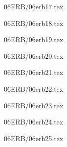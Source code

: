 \documentclass[9pt, xcolor={svgnames, x11names},professionalfonts]{beamer}
\def\scale{1}
\begin{document}

\begin{frame}{06ERB/06erb17.tex}	
	\def\scale{0.625}
	
\end{frame}


\begin{frame}{06ERB/06erb18.tex}	
	\def\scale{0.55}
	
\end{frame}


\begin{frame}{06ERB/06erb19.tex}	
	\def\scale{0.55}
	
\end{frame}


\begin{frame}{06ERB/06erb20.tex}	
	\def\scale{0.875}
	
\end{frame}


\begin{frame}{06ERB/06erb21.tex}	
	\def\scale{0.75}
	
\end{frame}


\begin{frame}{06ERB/06erb22.tex}	
	\def\scale{0.75}
	
\end{frame}


\begin{frame}{06ERB/06erb23.tex}	
	\def\scale{0.75}
	
\end{frame}


\begin{frame}{06ERB/06erb24.tex}	
	\def\scale{0.75}
	
\end{frame}


\begin{frame}{06ERB/06erb25.tex}	
	\def\scale{0.5}
	
\end{frame}




\end{document}
